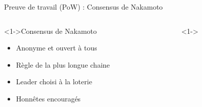 \documentclass[presentation]{beamer}
\begin{document}
\begin{frame}[label={sec:orgbc2e499}]{Preuve de travail (PoW) : Consensus de Nakamoto}


\begin{columns}
\begin{column}{0.50\columnwidth}
\begin{block}<1->{Consensus de Nakamoto}
\begin{itemize}
\item Anonyme et ouvert à tous
\item Règle de la plus longue chaine
\item Leader choisi à la loterie
\item Honnêtes encouragés
\end{itemize}
\end{block}
\end{column}
\begin{column}{0.50\columnwidth}
\begin{block}<1->{}
\end{block}
\end{column}
\end{columns}
\end{frame}
\end{document}
